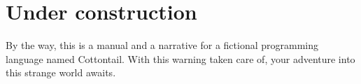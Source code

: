 \chapter{Under construction}

By the way, this is a manual and a narrative for a fictional
programming language named Cottontail. With this warning taken care
of, your adventure into this strange world awaits.
